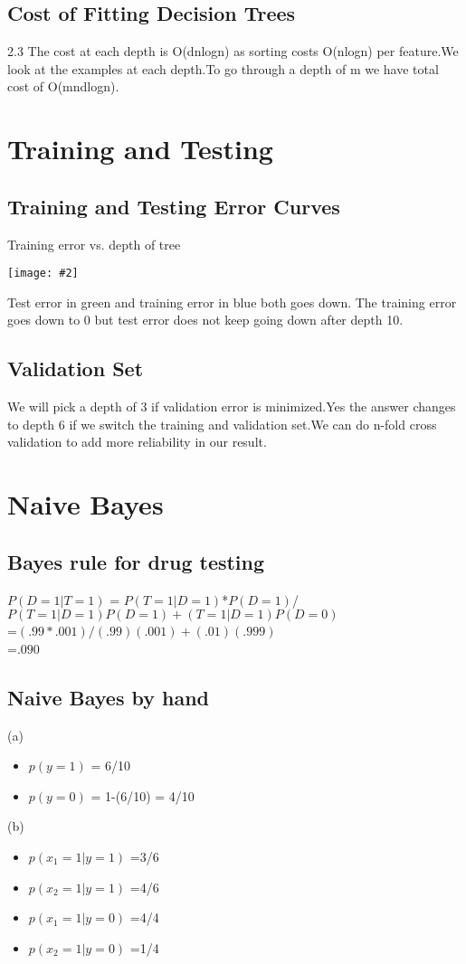 \documentclass{article}
\def\gre#1{{\color{gre}#1}}
\newcommand{\fig}[2]{\texttt{[image: \#2]}}
\def\items#1{\begin{itemize}#1\end{itemize}}
\begin{document}
\subsection{Cost of Fitting Decision Trees}
2.3 The cost at each depth is O(dnlogn) as sorting costs O(nlogn) per feature.We look at the examples at each depth.To go through a depth of m we have total cost of O(mndlogn).

\section{Training and Testing}
\subsection{Training and Testing Error Curves}
Training error vs. depth of tree \begin{center}
\fig{0.55}{../figs/3_1.png} %
\end{center}
Test error in green and training error in blue both goes down. The training error goes down to 0 but test error does not keep going down after depth 10.


\subsection{Validation Set}
We will pick a depth of 3 if validation error is minimized.Yes the answer changes to depth 6 if we switch the training and validation set.We can do n-fold cross validation to add more reliability in our result.

\section{Naive Bayes}
\subsection{Bayes rule for drug testing}
$P(D=1|T=1)$ = $P(T=1|D=1)$*$P(D=1)$/$P(T=1|D=1)P(D=1) +(T=1|D=1)P(D=0)$ \\
=$(.99*.001)/(.99)(.001)+(.01)(.999)$\\
=\gre {$.090$}\\

\subsection{Naive Bayes by hand}
(a)
\items{
\item $ p(y = 1)$ = \gre {6/10}
\item $p(y = 0)$ = {1-(6/10)} = \gre {4/10}
}
(b) 
\items{
\item $p(x_1 = 1 | y = 1)$ =\gre {3/6}
\item $p(x_2 = 1 | y = 1)$ =\gre {4/6}
\item $p(x_1 = 1 | y = 0)$ =\gre {4/4}
\item $p(x_2 = 1 | y = 0)$ =\gre {1/4}
}
\end{document}

